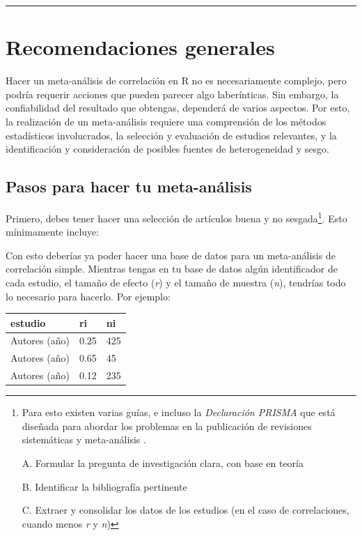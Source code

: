\documentclass[
  bookmarksnumbered]{article}
\begin{document}
\begin{center}\rule{0.5\linewidth}{0.5pt}\end{center}

\hypertarget{recomendaciones-generales}{%
\section{Recomendaciones generales}\label{recomendaciones-generales}}

Hacer un meta-análisis de correlación en R no es necesariamente complejo, pero podría requerir acciones que pueden parecer algo laberínticas. Sin embargo, la confiabilidad del resultado que obtengas, dependerá de varios aspectos. Por esto, la realización de un meta-análisis requiere una comprensión de los métodos estadísticos involucrados, la selección y evaluación de estudios relevantes, y la identificación y consideración de posibles fuentes de heterogeneidad y sesgo.

\hypertarget{pasos-para-hacer-tu-meta-anuxe1lisis}{%
\subsection{Pasos para hacer tu meta-análisis}\label{pasos-para-hacer-tu-meta-anuxe1lisis}}

Primero, debes tener hacer una selección de artículos buena y no sesgada\footnote{Para esto existen varias guías, e incluso la \emph{Declaración PRISMA} que está diseñada para abordar los problemas en la publicación de revisiones sistemáticas y meta-análisis \autocites[para información en español, ver e.g.,][]{huttonExtensionDeclaracionPRISMA2016,pageDeclaracionPRISMA20202021}.

  A. Formular la pregunta de investigación clara, con base en teoría

  B. Identificar la bibliografía pertinente

  C. Extraer y consolidar los datos de los estudios (en el caso de correlaciones, cuando menos \emph{r} y \emph{n})}. Esto mínimamente incluye:

Con esto deberías ya poder hacer una base de datos para un meta-análisis de correlación simple. Mientras tengas en tu base de datos algún identificador de cada estudio, el tamaño de efecto (\emph{r}) y el tamaño de muestra (\emph{n}), tendrías todo lo necesario para hacerlo. Por ejemplo:

\begin{longtable}[]{@{}lll@{}}
\toprule()
estudio & ri & ni \\
\midrule()
\endhead
Autores (año) & 0.25 & 425 \\
Autores (año) & 0.65 & 45 \\
Autores (año) & 0.12 & 235 \\
\bottomrule()
\end{longtable}
\end{document}
